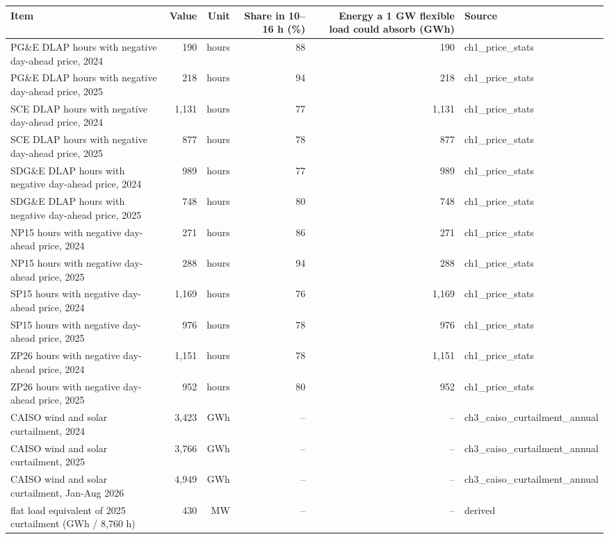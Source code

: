 \begin{tabular}{lrrrrl}
\toprule
Item & Value & Unit & Share in 10--16 h (\%) & Energy a 1 GW flexible load could absorb (GWh) & Source \\
\midrule
PG\&E DLAP hours with negative day-ahead price, 2024 & 190 & hours & 88 & 190 & ch1\_price\_stats \\
PG\&E DLAP hours with negative day-ahead price, 2025 & 218 & hours & 94 & 218 & ch1\_price\_stats \\
SCE DLAP hours with negative day-ahead price, 2024 & 1,131 & hours & 77 & 1,131 & ch1\_price\_stats \\
SCE DLAP hours with negative day-ahead price, 2025 & 877 & hours & 78 & 877 & ch1\_price\_stats \\
SDG\&E DLAP hours with negative day-ahead price, 2024 & 989 & hours & 77 & 989 & ch1\_price\_stats \\
SDG\&E DLAP hours with negative day-ahead price, 2025 & 748 & hours & 80 & 748 & ch1\_price\_stats \\
NP15 hours with negative day-ahead price, 2024 & 271 & hours & 86 & 271 & ch1\_price\_stats \\
NP15 hours with negative day-ahead price, 2025 & 288 & hours & 94 & 288 & ch1\_price\_stats \\
SP15 hours with negative day-ahead price, 2024 & 1,169 & hours & 76 & 1,169 & ch1\_price\_stats \\
SP15 hours with negative day-ahead price, 2025 & 976 & hours & 78 & 976 & ch1\_price\_stats \\
ZP26 hours with negative day-ahead price, 2024 & 1,151 & hours & 78 & 1,151 & ch1\_price\_stats \\
ZP26 hours with negative day-ahead price, 2025 & 952 & hours & 80 & 952 & ch1\_price\_stats \\
CAISO wind and solar curtailment, 2024 & 3,423 & GWh & -- & -- & ch3\_caiso\_curtailment\_annual \\
CAISO wind and solar curtailment, 2025 & 3,766 & GWh & -- & -- & ch3\_caiso\_curtailment\_annual \\
CAISO wind and solar curtailment, Jan-Aug 2026 & 4,949 & GWh & -- & -- & ch3\_caiso\_curtailment\_annual \\
flat load equivalent of 2025 curtailment (GWh / 8,760 h) & 430 & MW & -- & -- & derived \\
\bottomrule
\end{tabular}
